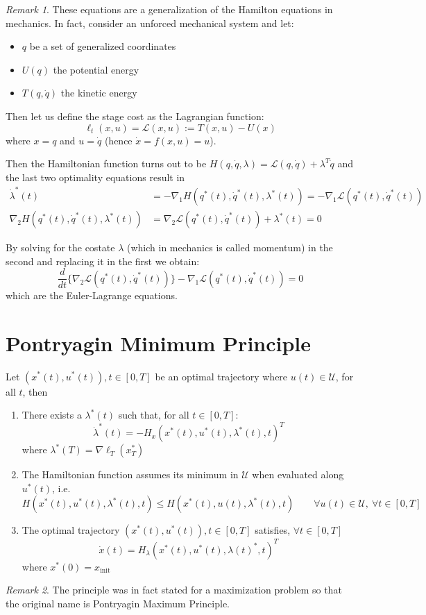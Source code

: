 \documentclass[openany]{book}
\theoremstyle{definition}
\theoremstyle{remark}
\newtheorem*{remark}{Remark}
\begin{document}
\begin{remark}
These equations are a generalization of the Hamilton equations in mechanics. In fact, consider an unforced mechanical system and let:
\begin{itemize}
    \item $q$ be a set of generalized coordinates
    \item $U(q)$ the potential energy
    \item $T(q,\dot{q})$ the kinetic energy
\end{itemize}
Then let us define the stage cost as the Lagrangian function:
\[
    \ell_t(x,u) = \mathcal{L}(x,u) := T(x,u) - U(x)
\]
where $x = q$ and $u = \dot{q}$ (hence $\dot{x} = f(x,u) = u$).

Then the Hamiltonian function turns out to be $H(q,\dot{q},\lambda) = \mathcal{L}(q,\dot{q}) + \lambda^T\dot{q}$ and the last two optimality equations result in
\begin{align*}
    \dot{\lambda}^*(t) &= -\nabla_1H(q^*(t),\dot{q}^*(t),\lambda^*(t)) = -\nabla_1\mathcal{L}(q^*(t),\dot{q}^*(t))\\
    \nabla_2H(q^*(t),\dot{q}^*(t),\lambda^*(t)) &= \nabla_2\mathcal{L}(q^*(t),\dot{q}^*(t)) + \lambda^*(t) = 0
\end{align*}

By solving for the costate $\lambda$ (which in mechanics is called momentum) in the second and replacing it in the first we obtain:
\[
    \frac{d}{dt}\{\nabla_2\mathcal{L}(q^*(t),\dot{q}^*(t))\} - \nabla_1\mathcal{L}(q^*(t),\dot{q}^*(t)) = 0
\]
which are the Euler-Lagrange equations.
\end{remark}

\section{Pontryagin Minimum Principle}
Let $(x^*(t),u^*(t)), t\in[0,T]$ be an optimal trajectory where $u(t)\in\mathcal{U}$, for all $t$, then 
\begin{enumerate}
    \item There exists a $\lambda^*(t)$ such that, for all $t\in[0,T]$:
        \[
            \dot{\lambda}^*(t) = -H_x(x^*(t),u^*(t),\lambda^*(t),t)^T
        \]
        where $\lambda^*(T)=\nabla\ell_T(x_T^*)$
    \item The Hamiltonian function assumes its minimum in $\mathcal{U}$ when evaluated along $u^*(t)$, i.e. 
        \[
            H(x^*(t),u^*(t),\lambda^*(t),t) \leq H(x^*(t),u(t),\lambda^*(t),t) \qquad \forall u(t)\in \mathcal{U},\ \forall t\in[0,T]
        \]
    \item The optimal trajectory $(x^*(t),u^*(t)), t\in[0,T]$ satisfies, $\forall t \in[0,T]$ 
        \[
            \dot{x}(t) = H_\lambda(x^*(t),u^*(t),\lambda(t)^*,t)^T
        \]
        where $x^*(0) = x_{\text{init}}$
\end{enumerate}
\begin{remark}
    The principle was in fact stated for a maximization problem so that the original name is
Pontryagin Maximum Principle.
\end{remark}
\end{document}
